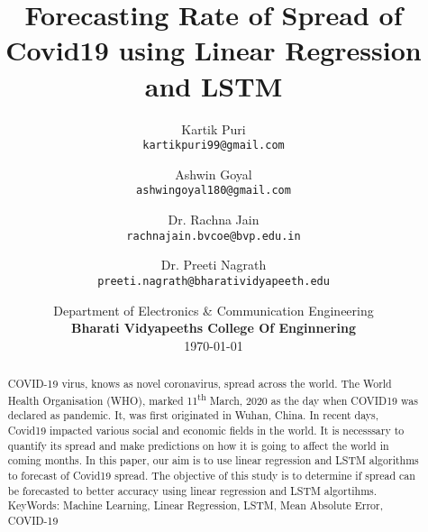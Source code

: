 \documentclass[11pt]{article}
\title{Forecasting Rate of Spread of Covid19 using Linear Regression and LSTM}
\author{ Kartik Puri\\ \texttt{kartikpuri99@gmail.com}
	 \and
	Ashwin Goyal\\ \texttt{ashwingoyal180@gmail.com} \\
	 \and
	Dr. Rachna Jain\\ \texttt{rachnajain.bvcoe@bvp.edu.in}
	 \and
	Dr. Preeti Nagrath\\ \texttt{preeti.nagrath@bharatividyapeeth.edu} \\
  }
\date{\small{Department of Electronics \& Communication Engineering} \\ \textbf{Bharati
Vidyapeeths College Of Enginnering}  \\ \today}
\begin{document}
\maketitle
\begin{abstract}
	COVID-19 virus, knows as novel coronavirus, spread across
	the world. The World Health Organisation (WHO), marked
	11\textsuperscript{th} March, 2020 as the day when COVID19 was
	declared as pandemic. It, was first
	originated in Wuhan, China.
	In recent days, Covid19 impacted various
	social and economic fields in the world.
	It is necesssary to
	quantify its spread and make predictions on how it is going to
	affect the world in coming months.
	In this paper, our aim is to use linear
	regression and LSTM algorithms to forecast of Covid19 spread.
	The objective of this study is to determine if spread can be
	forecasted to better accuracy using linear regression and LSTM
	algortihms.
	 \\


	KeyWords: Machine Learning, Linear Regression, LSTM, Mean
	Absolute Error, COVID-19
	\\
	\\
\end{abstract}



\printbibliography
\end{document}
